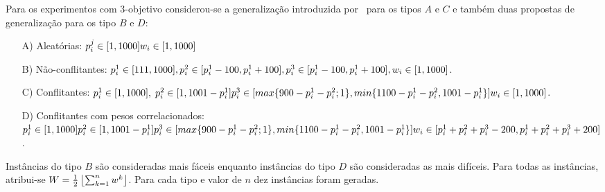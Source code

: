 Para os experimentos com $3$-objetivo considerou-se
a generalização introduzida por~\cite{bazgan2009}
para os tipos $A$ e $C$ e também duas propostas de generalização
para os tipo $B$ e $D$:
\begin{enumerate}
  \item[A)] Aleatórias: $
    p^j_i \in [1, 1000]\\
    w_i \in [1,1000]$
  \item[B)] Não-conflitantes: $
    p^1_i \in [111, 1000],\\
    p^2_i \in [p^1_i - 100, p^1_i + 100],\\
    p^3_i \in [p^1_i - 100, p^1_i + 100],\\
    w_i \in [1,1000]$.
  \item[C)] Conflitantes: $
    p^1_i \in [1, 1000], \;
    p^2_i \in [1, 1001 - p^1_i] \\
    p^3_i \in [max\{900-p^1_i-p^2_i;1\}, min\{1100-p^1_i-p^2_i, 1001-p^1_i\}]\\
    w_i \in [1,1000]$.
  \item[D)] Conflitantes com pesos correlacionados: $
    p^1_i \in [1, 1000]\\
    p^2_i \in [1, 1001 - p^1_i] \\
    p^3_i \in [max\{900-p^1_i-p^2_i;1\}, min\{1100-p^1_i-p^2_i, 1001-p^1_i\}]\\
    w_i \in [p^1_i+p^2_i+p^3_i-200, p^1_i+p^2_i+p^3_i+200]$.
\end{enumerate}
Instâncias do tipo $B$ são consideradas mais fáceis enquanto instâncias do
tipo $D$ são consideradas as mais difíceis.
Para todas as instâncias, atribui-se $W=\frac{1}{2}\left \lfloor{\sum^n_{k=1} w^k}\right \rfloor$.
Para cada tipo e valor de $n$ dez instâncias foram geradas.




